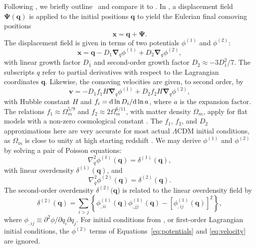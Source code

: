 Following \citet{2010MNRAS.403.1859J}, we briefly outline \lpt\ and compare it to \za.  In \lpt, a displacement field $\boldsymbol{\Psi}(\boldsymbol{q})$ is applied to the initial positions $\boldsymbol{q}$ to yield the Eulerian final comoving positions
\begin{equation} \label{eq:displacement}
	\boldsymbol{x} = \boldsymbol{q} + \boldsymbol{\Psi}.
\end{equation}
The displacement field is given in terms of two potentials $\phi^{(1)}$ and $\phi^{(2)}$:
\begin{equation} \label{eq:potentials}
	\boldsymbol{x} = \boldsymbol{q} - D_{1} \boldsymbol{\nabla}_{q} \phi^{(1)} + D_{2} \boldsymbol{\nabla}_{q} \phi^{(2)},
\end{equation}
with linear growth factor $D_{1}$ and second-order growth factor $D_{2} \approx -3 D_{1}^{2} / 7$.  The subscripts $q$ refer to partial derivatives with respect to the Lagrangian coordinates $\boldsymbol{q}$.  Likewise, the comoving velocities are given, to second order, by
\begin{equation} \label{eq:velocity}
	\boldsymbol{v} =  - D_{1} f_{1} H \boldsymbol{\nabla}_{q} \phi^{(1)} + D_{2} f_{2} H \boldsymbol{\nabla}_{q} \phi^{(2)},
\end{equation}
with Hubble constant $H$ and $f_{i} = {\rm {d}}\, \mathrm{ln}\, D_{i} / {\rm {d}}\, \mathrm{ln}\, a$, where $a$ is the expansion factor.  The relations $f_{1} \approx \Omega_{m}^{5/9}$ and $f_{2} \approx 2 \Omega_{m}^{6/11}$, with matter density $\Omega_{m}$, apply for flat models with a non-zero cosmological constant \citep{1995A&A...296..575B}.  The $f_{1}$, $f_{2}$, and $D_{2}$ approximations here are very accurate for most actual $\Lambda$CDM initial conditions, as $\Omega_{m}$ is close to unity at high starting redshift \citep{2010MNRAS.403.1859J}.  We may derive $\phi^{(1)}$ and $\phi^{(2)}$ by solving a pair of Poisson equations:
\begin{equation} \label{eq:poisson1}
	\nabla_{q}^{2} \phi^{(1)}(\boldsymbol{q}) = \delta^{(1)}(\boldsymbol{q}),
\end{equation}
with linear overdensity $\delta^{(1)}(\boldsymbol{q})$, and
\begin{equation} \label{eq:poisson2}
	\nabla_{q}^{2} \phi^{(2)}(\boldsymbol{q}) = \delta^{(2)}(\boldsymbol{q}).
\end{equation}
The second-order overdensity $\delta^{(2)}(\boldsymbol{q}$) is related to the linear overdensity field by
\begin{equation} \label{eq:second-order_overdensity}
	\delta^{(2)}(\boldsymbol{q}) = \sum_{i > j} \left\{ \phi_{,ii}^{(1)}(\boldsymbol{q}) \phi_{,jj}^{(1)}(\boldsymbol{q}) - \left[ \phi_{,ij}^{(1)}(\boldsymbol{q}) \right]^{2} \right\},
\end{equation}
where $\phi_{,ij} \equiv \partial^{2} \phi / \partial q_{i} \partial q_{j}$.  For initial conditions from \za, or first-order Lagrangian initial conditions, the $\phi^{(2)}$ terms of Equations~\ref{eq:potentials} and \ref{eq:velocity} are ignored.




